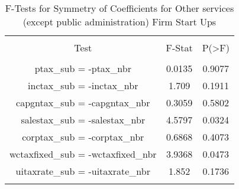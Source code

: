 
\begin{table}[!htbp] \centering 
  \caption{F-Tests for Symmetry of Coefficients for Other services (except public administration) Firm Start Ups} 
  \label{81Ftests} 
\begin{tabular}{@{\extracolsep{5pt}} ccc} 
\\[-1.8ex]\hline 
\hline \\[-1.8ex] 
Test & F-Stat & P(\textgreater F) \\ 
\hline \\[-1.8ex] 
ptax\_sub = -ptax\_nbr & 0.0135 & 0.9077 \\ 
inctax\_sub = -inctax\_nbr & 1.709 & 0.1911 \\ 
capgntax\_sub = -capgntax\_nbr & 0.3059 & 0.5802 \\ 
salestax\_sub = -salestax\_nbr & 4.5797 & 0.0324 \\ 
corptax\_sub = -corptax\_nbr & 0.6868 & 0.4073 \\ 
wctaxfixed\_sub = -wctaxfixed\_nbr & 3.9368 & 0.0473 \\ 
uitaxrate\_sub = -uitaxrate\_nbr & 1.852 & 0.1736 \\ 
\hline \\[-1.8ex] 
\end{tabular} 
\end{table} 
